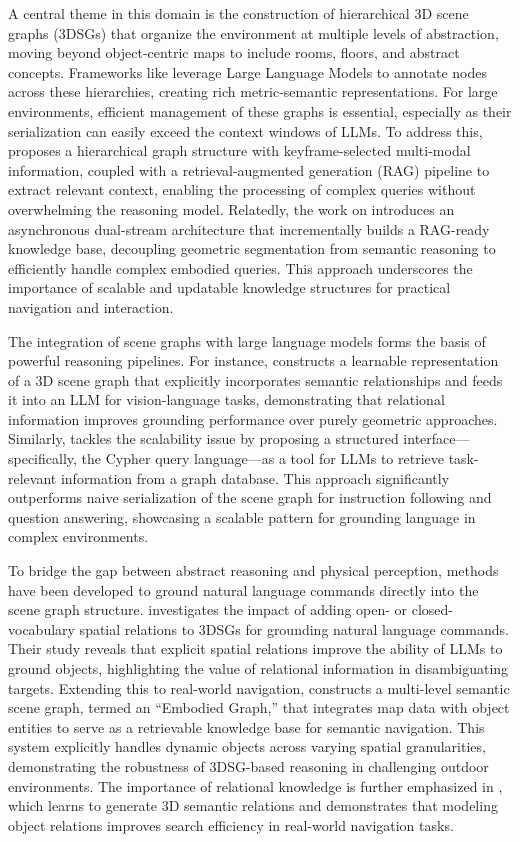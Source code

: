 \documentclass[11pt]{article}
\begin{document}
A central theme in this domain is the construction of hierarchical 3D scene graphs (3DSGs) that organize the environment at multiple levels of abstraction, moving beyond object-centric maps to include rooms, floors, and abstract concepts. Frameworks like \cite{ref521} leverage Large Language Models to annotate nodes across these hierarchies, creating rich metric-semantic representations. For large environments, efficient management of these graphs is essential, especially as their serialization can easily exceed the context windows of LLMs. To address this, \cite{ref522} proposes a hierarchical graph structure with keyframe-selected multi-modal information, coupled with a retrieval-augmented generation (RAG) pipeline to extract relevant context, enabling the processing of complex queries without overwhelming the reasoning model. Relatedly, the work on \cite{ref523} introduces an asynchronous dual-stream architecture that incrementally builds a RAG-ready knowledge base, decoupling geometric segmentation from semantic reasoning to efficiently handle complex embodied queries. This approach underscores the importance of scalable and updatable knowledge structures for practical navigation and interaction.

The integration of scene graphs with large language models forms the basis of powerful reasoning pipelines. For instance, \cite{ref524} constructs a learnable representation of a 3D scene graph that explicitly incorporates semantic relationships and feeds it into an LLM for vision-language tasks, demonstrating that relational information improves grounding performance over purely geometric approaches. Similarly, \cite{ref525} tackles the scalability issue by proposing a structured interface---specifically, the Cypher query language---as a tool for LLMs to retrieve task-relevant information from a graph database. This approach significantly outperforms naive serialization of the scene graph for instruction following and question answering, showcasing a scalable pattern for grounding language in complex environments.

To bridge the gap between abstract reasoning and physical perception, methods have been developed to ground natural language commands directly into the scene graph structure. \cite{ref526} investigates the impact of adding open- or closed-vocabulary spatial relations to 3DSGs for grounding natural language commands. Their study reveals that explicit spatial relations improve the ability of LLMs to ground objects, highlighting the value of relational information in disambiguating targets. Extending this to real-world navigation, \cite{ref527} constructs a multi-level semantic scene graph, termed an ``Embodied Graph,'' that integrates map data with object entities to serve as a retrievable knowledge base for semantic navigation. This system explicitly handles dynamic objects across varying spatial granularities, demonstrating the robustness of 3DSG-based reasoning in challenging outdoor environments. The importance of relational knowledge is further emphasized in \cite{ref528}, which learns to generate 3D semantic relations and demonstrates that modeling object relations improves search efficiency in real-world navigation tasks.
\end{document}
